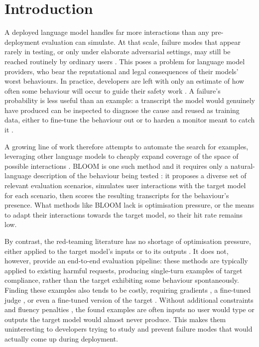 \documentclass{article}
\theoremstyle{plain}
\theoremstyle{definition}
\theoremstyle{remark}
\begin{document}
\section{Introduction}

A deployed language model handles far more interactions than any pre-deployment evaluation can simulate. At that scale, failure modes that appear rarely in testing, or only under elaborate adversarial settings, may still be reached routinely by ordinary users \citep{jones2025forecasting}.
This poses a problem for language model providers, who bear the reputational and legal consequences of their models' worst behaviours.
In practice, developers are left with only an estimate of how often some behaviour will occur to guide their safety work \citep{scholten2024probabilistic,wu2024rare,angell2026tail}. A failure's probability is less useful than an example: a transcript the model would genuinely have produced can be inspected to diagnose the cause and reused as training data, either to fine-tune the behaviour out or to harden a monitor meant to catch it  \citep{sheshadri2025latentadversarialtrainingimproves, sharma2025constitutional}.

A growing line of work therefore attempts to automate the search for examples, leveraging other language models to cheaply expand coverage of the space of possible interactions \citep{perez2022redteaming,brown2025task,feng2025dataswarms,huang2025multiturn}.
BLOOM is one such method and it requires only a natural-language description of the behaviour being tested \citep{gupta2025bloom}: it proposes a diverse set of relevant evaluation scenarios, simulates user interactions with the target model for each scenario, then scores the resulting transcripts for the behaviour's presence.
What methods like BLOOM lack is optimisation pressure, or the means to adapt their interactions towards the target model, so their hit rate remains low.


By contrast, the red-teaming literature has no shortage of optimisation pressure, either applied to the target model's inputs \citep{sadasivan2024fast,chao2023jailbreaking} or to its outputs \citep{zhao2024weak,zhou2024emulated}.
It does not, however, provide an end-to-end evaluation pipeline: these methods are typically applied to existing harmful requests, producing single-turn examples of target compliance, rather than the target exhibiting some behaviour spontaneously.
Finding these examples also tends to be costly, requiring gradients \citep{zou2023universal}, a fine-tuned judge \citep{mazeika2024harmbench}, or even a fine-tuned version of the target \citep{thompson2024flrt}.
Without additional constraints and fluency penalties \citep{thompson2024flrt}, the found examples are often inputs no user would type or outputs the target model would almost never produce. This makes them uninteresting to developers trying to study and prevent failure modes that would actually come up during deployment.
\end{document}
